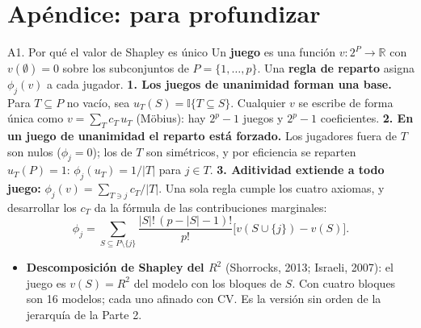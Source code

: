 \documentclass{beamer}
\newcommand{\1}{\mathbb{I}}
\begin{document}
\section{Apéndice: para profundizar}
\begin{frame}[noframenumbering]
\tableofcontents[currentsection]
\end{frame}

\begin{frame}{A1. Por qué el valor de Shapley es único}
\small
Un \textbf{juego} es una función $v: 2^{P} \to \mathbb{R}$ con $v(\emptyset) = 0$ sobre los subconjuntos de $P = \{1, \ldots, p\}$. Una \textbf{regla de reparto} asigna $\phi_j(v)$ a cada jugador.
\pause
\textbf{1. Los juegos de unanimidad forman una base.} Para $T \subseteq P$ no vacío, sea $u_T(S) = \1\{T \subseteq S\}$. Cualquier $v$ se escribe de forma única como $v = \sum_T c_T\, u_T$ (Möbius): hay $2^p - 1$ juegos y $2^p - 1$ coeficientes.
\pause
\textbf{2. En un juego de unanimidad el reparto está forzado.} Los jugadores fuera de $T$ son nulos ($\phi_j = 0$); los de $T$ son simétricos, y por eficiencia se reparten $u_T(P) = 1$: $\phi_j(u_T) = 1/|T|$ para $j \in T$.
\pause
\textbf{3. Aditividad extiende a todo juego:} $\phi_j(v) = \sum_{T \ni j} c_T / |T|$. Una sola regla cumple los cuatro axiomas, y desarrollar los $c_T$ da la fórmula de las contribuciones marginales:
\[ \phi_j = \sum_{S \subseteq P \setminus \{j\}} \frac{|S|!\,(p-|S|-1)!}{p!} \Big[ v(S \cup \{j\}) - v(S) \Big]. \]
\pause
\begin{itemize}\itemsep2pt
  \item \textbf{Descomposición de Shapley del $R^2$} (Shorrocks, 2013; Israeli, 2007): el juego es $v(S) = R^2$ del modelo con los bloques de $S$. Con cuatro bloques son 16 modelos; cada uno afinado con CV. Es la versión sin orden de la jerarquía de la Parte 2.
\end{itemize}
\end{frame}
\end{document}
